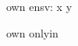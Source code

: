 \documentclass{article}
\newcommand\ensv[2]{own ensv: #1 #2}
\newenvironment{onlyin}{own onlyin}{}
\begin{document}
\ensv{x}{y}

\begin{onlyin}
\end{onlyin}
\end{document}
